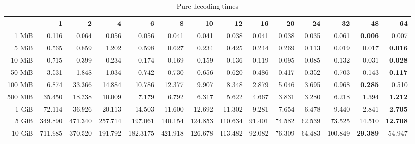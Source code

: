 \begin{table}[!h]
	\centering
	\caption{Pure decoding times}
	\begin{tabular}{rrrrrrrrrrrrrr}
		\toprule
		\diagbox[width=7em]{Sizes}{Threads} & 1  &      2  &      4  &      6  &      8  &      10 &      12 &     16 &     20 &     24 &      32 &     48 &     64 \\
		\midrule
		1 MiB   &   0.116 &   0.064 &   0.056 &   0.056 &   0.041 &   0.041 &   0.038 &  0.041 &  0.038 &  0.035 &   0.061 &  \textbf{0.006} &  0.007 \\
		5 MiB   &   0.565 &   0.859 &   1.202 &   0.598 &   0.627 &   0.234 &   0.425 &  0.244 &  0.269 &  0.113 &   0.019 &  0.017 &  \textbf{0.016} \\
		10 MiB  &   0.715 &   0.399 &   0.234 &   0.174 &   0.169 &   0.159 &   0.136 &  0.119 &  0.095 &  0.085 &   0.132 &  0.031 &  \textbf{0.028} \\
		50 MiB  &   3.531 &   1.848 &   1.034 &   0.742 &   0.730 &   0.656 &   0.620 &  0.486 &  0.417 &  0.352 &   0.703 &  0.143 &  \textbf{0.117} \\
		100 MiB &   6.874 &  33.366 &  14.884 &  10.786 &  12.377 &   9.907 &   8.348 &  2.879 &  5.046 &  3.695 &   0.968 &  \textbf{0.285} &  0.510 \\
		500 MiB &  35.450 &  18.238 &  10.009 &   7.179 &   6.792 &   6.317 &   5.622 &  4.667 &  3.831 &  3.280 &   6.218 &  1.394 &  \textbf{1.212} \\
		1 GiB   &  72.114 &  36.926 &  20.113 &  14.503 &  11.600 &  12.692 &  11.302 &  9.281 &  7.654 &  6.478 &   9.440 &  2.841 &  \textbf{2.705} \\
		5 GiB   & 349.890 & 471.340 & 257.714 & 197.061 & 140.154 & 124.853 & 110.634 & 91.401 & 74.582 & 62.539 &  73.525 & 14.510 & \textbf{12.708} \\
		10 GiB  & 711.985 & 370.520 & 191.792 & 182.3175 & 421.918 & 126.678 & 113.482 & 92.082 & 76.309 & 64.483 & 100.849 & \textbf{29.389} & 54.947 \\
		\bottomrule
	\end{tabular}
\end{table}

